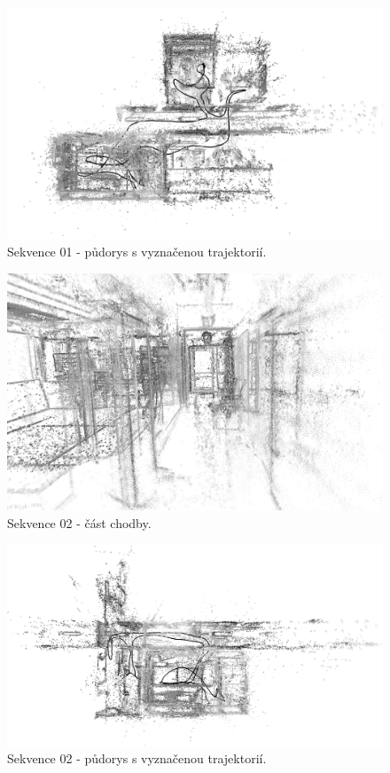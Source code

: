 \documentclass[12pt,a4paper]{report}
\begin{document}
\begin{figure}[H]
\centering
\includegraphics[width=1.0\textwidth]{img/DSO_01_top_b.png}
\caption{Sekvence 01 - půdorys s vyznačenou trajektorií.}
\label{17}
\end{figure} 

\begin{figure}[H]
\centering
\includegraphics[width=1.0\textwidth]{img/DSO_02_chodba.png}
\caption{Sekvence 02 - část chodby.}
\label{18}
\end{figure} 

\begin{figure}[H]
\centering
\includegraphics[width=1.0\textwidth]{img/DSO_02_top_b.png}
\caption{Sekvence 02 - půdorys s vyznačenou trajektorií.}
\label{19}
\end{figure} 
\end{document}
